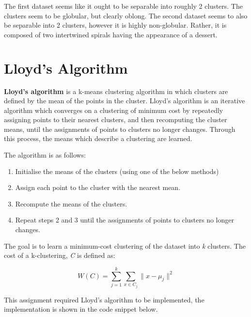 \documentclass[12pt]{article}
\begin{document}
The first dataset seems like it ought to be separable into roughly 2 clusters.
The clusters seem to be globular, but clearly oblong. The second dataset
seems to also be separable into 2 clusters, however it is highly non-globular.
Rather, it is composed of two intertwined spirals having the appearance of a
dessert.

\section{Lloyd's Algorithm}

\textbf{Lloyd's algorithm} is a k-means clustering algorithm in which 
clusters are defined by the mean of the points in the cluster. Lloyd's algorithm 
is an iterative algorithm which converges on a clustering of minimum cost by 
repeatedly assigning points to their nearest clusters, and then recomputing the
cluster means, until the assignments of points to clusters no longer changes.
Through this process, the means which describe a clustering are learned. 

The algorithm is as follows:

\begin{enumerate}
    \item Initialise the means of the clusters (using one of the below methods)
    \item Assign each point to the cluster with the nearest mean.
    \item Recompute the means of the clusters.
    \item Repeat steps 2 and 3 until the assignments of points to clusters no
    longer changes.
\end{enumerate}

The goal is to learn a minimum-cost clustering of the dataset into \textit{k}
clusters. The cost of a k-clustering, \textit{C} is defined as:

\begin{equation}
    W(C) = \sum_{j=1}^{k} \sum_{x \in C_j} \lVert x - \mu_j \rVert^2
\end{equation}

This assignment required Lloyd's algorithm to be implemented, the implementation
is shown in the code snippet below.
\end{document}
